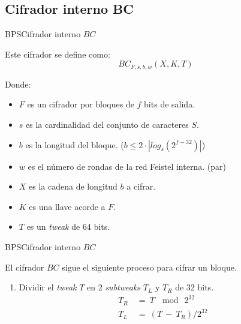 %
%

\subsection{Cifrador interno BC}

\begin{frame}{BPS}{Cifrador interno $BC$}

  Este cifrador se define como:
    \begin{equation}
      BC_{F,s,b,w}(X,K,T)
    \end{equation}
    
  Donde:
  \begin{itemize}
    \item $F$ es un cifrador por bloques de $f$ bits de salida.
    \item $s$ es la cardinalidad del conjunto de caracteres $S$.
    \item $b$ es la longitud del bloque. ($b \leq 2 \cdot |log_s(2^{f-32})|$)
    \item $w$ es el número de rondas de la red Feistel interna. (par)
    \item $X$ es la cadena de longitud $b$ a cifrar.
    \item $K$ es una llave acorde a $F$.
    \item $T$ es un \textit{tweak} de 64 bits.
  \end{itemize}
  
\end{frame}

\begin{frame}{BPS}{Cifrador interno $BC$}

  El cifrador $BC$ sigue el siguiente proceso para cifrar un bloque.
  
  \begin{enumerate}  
    \item Dividir el \textit{tweak} $T$ en 2 \textit{subtweaks} $T_L$ y $T_R$
    de 32 bits.
      \begin{align}
        T_R\: &=\: T\: \mod\: 2^{32}  \\
        T_L\: &=\: (T\: -\: T_R) / 2^{32}
      \end{align}
  \end{enumerate}
  
\end{frame}

